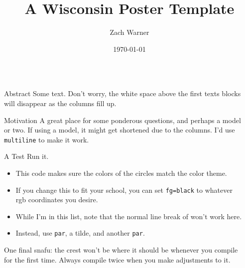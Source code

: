 \documentclass[serif,mathserif,final]{beamer}
\title{A Wisconsin Poster Template}
\author{Zach Warner}
\date{\today}
\institute{zwarner@wisc.edu} %
\begin{document}
\begin{frame}{}
  \begin{columns}[t]

    \begin{column}{0.32\linewidth}

      \begin{block}{Abstract}
        Some text. Don't worry, the white space above the first texts blocks will disappear as the columns fill up.
      \end{block}

       \begin{block}{Motivation}      
       A great place for some ponderous questions, and perhaps a model or two. If using a model, it might get shortened due to the columns. I'd use \texttt{multiline} to make it work. 
      \end{block}



     \begin{block}{A Test}
         Run it.
         \begin{itemize}
          \item<circ@1->
          This code makes sure the colors of the circles match the color theme.
           \item<circ@1->
           If you change this to fit your school, you can set \texttt{fg=black} to whatever rgb coordinates you desire.
            \item<circ@1->
            While I'm in this list, note that the normal line break of won't work here. 
			\item<circ@1->            
            Instead, use \texttt{par}, a tilde, and another \texttt{par}.
         \end{itemize}
         One final snafu: the crest won't be where it should be whenever you compile for the first time. Always compile twice when you make adjustments to it.
     \end{block}
     
     
    \end{column}%

    \begin{column}{0.32\linewidth}


\end{column}
\end{columns}
\end{frame}
\end{document}

